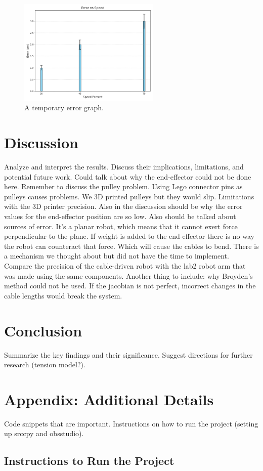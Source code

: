 \documentclass[11pt]{article}
\begin{document}
\begin{figure}[h]
\centering
\includegraphics[width=0.6\textwidth]{TmpGraph.png}
\caption{A temporary error graph.}
\label{fig:figure5}
\end{figure}

\section{Discussion}
Analyze and interpret the results. Discuss their implications, limitations, and potential future work.
Could talk about why the end-effector could not be done here.
Remember to discuss the pulley problem. Using Lego connector pins as pulleys causes problems. We 3D printed pulleys
but they would slip. Limitations with the 3D printer precision. Also in the discussion should be why the error
values for the end-effector position are so low. Also should be talked about sources of error.
It's a planar robot, which means that it cannot exert force perpendicular to the plane. If weight is added to the end-effector
there is no way the robot can counteract that force. Which will cause the cables to bend. There is a mechanism we thought
about but did not have the time to implement. Compare the precision of the cable-driven robot with the lab2 robot arm that was
made using the same components. Another thing to include: why Broyden's method could not be used. If the jacobian is not
perfect, incorrect changes in the cable lengths would break the system.

\section{Conclusion}
Summarize the key findings and their significance. Suggest directions for further research (tension model?).





\appendix
\section{Appendix: Additional Details}
Code snippets that are important. Instructions on how to run the project (setting up srccpy and obsstudio).

\subsection{Instructions to Run the Project}
\end{document}
